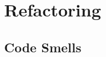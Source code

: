 \chapter{Refactoring}
\label{chapter:refactoring}

\section{Code Smells}
\label{section:code_smells}

